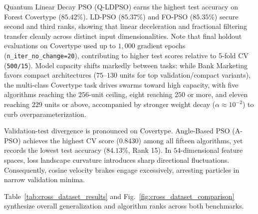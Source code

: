 \documentclass[10pt]{article}
\begin{document}
Quantum Linear Decay PSO (Q-LDPSO) earns the highest test accuracy on Forest Covertype ($85.42\%$). LD-PSO ($85.37\%$) and FO-PSO ($85.35\%$) secure second and third ranks, showing that linear deceleration and fractional filtering transfer cleanly across distinct input dimensionalities. Note that final holdout evaluations on Covertype used up to $1{,}000$ gradient epochs (\texttt{n\_iter\_no\_change=20}), contributing to higher test scores relative to 5-fold CV (\texttt{500/15}). Model capacity shifts markedly between tasks: while Bank Marketing favors compact architectures ($75$--$130$ units for top validation/compact variants), the multi-class Covertype task drives swarms toward high capacity, with five algorithms reaching the $256$-unit ceiling, eight reaching $250$ or more, and eleven reaching $229$ units or above, accompanied by stronger weight decay ($\alpha \approx 10^{-2}$) to curb overparameterization.

Validation-test divergence is pronounced on Covertype. Angle-Based PSO (A-PSO) achieves the highest CV score ($0.8430$) among all fifteen algorithms, yet records the lowest test accuracy ($84.13\%$, Rank 15). In $54$-dimensional feature spaces, loss landscape curvature introduces sharp directional fluctuations. Consequently, cosine velocity brakes engage excessively, arresting particles in narrow validation minima.

Table~\ref{tab:cross_dataset_results} and Fig.~\ref{fig:cross_dataset_comparison} synthesize overall generalization and algorithm ranks across both benchmarks.
\end{document}
